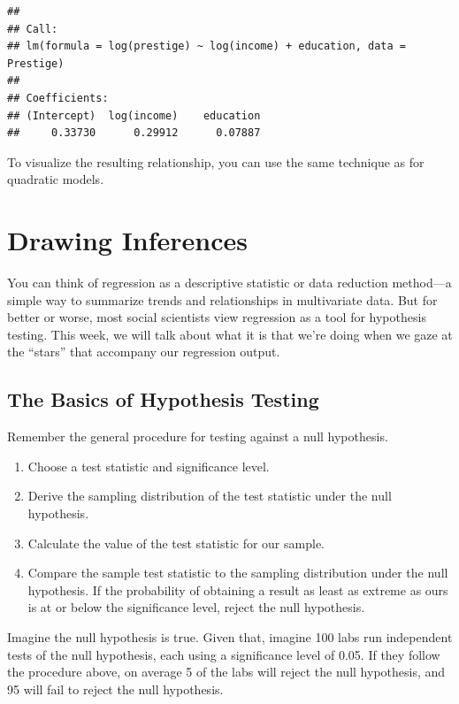 \documentclass[12pt,oneside,openany]{book}
\begin{document}
\begin{verbatim}
## 
## Call:
## lm(formula = log(prestige) ~ log(income) + education, data = Prestige)
## 
## Coefficients:
## (Intercept)  log(income)    education  
##     0.33730      0.29912      0.07887
\end{verbatim}

To visualize the resulting relationship, you can use the same technique
as for quadratic models.

\chapter{Drawing Inferences}\label{inference}

\providecommand{\Cov}{}
\renewcommand{\Cov}{\mathop{\rm Cov}\nolimits}
\providecommand{\SE}{}
\renewcommand{\SE}{\mathop{\rm SE}\nolimits}
\providecommand{\CI}{}
\renewcommand{\CI}{\mathop{\rm CI}\nolimits}

You can think of regression as a descriptive statistic or data reduction
method---a simple way to summarize trends and relationships in
multivariate data. But for better or worse, most social scientists view
regression as a tool for hypothesis testing. This week, we will talk
about what it is that we're doing when we gaze at the ``stars'' that
accompany our regression output.

\section{The Basics of Hypothesis
Testing}\label{the-basics-of-hypothesis-testing}

Remember the general procedure for testing against a null hypothesis.

\begin{enumerate}
\def\labelenumi{\arabic{enumi}.}
\item
  Choose a test statistic and significance level.
\item
  Derive the sampling distribution of the test statistic under the null
  hypothesis.
\item
  Calculate the value of the test statistic for our sample.
\item
  Compare the sample test statistic to the sampling distribution under
  the null hypothesis. If the probability of obtaining a result as least
  as extreme as ours is at or below the significance level, reject the
  null hypothesis.
\end{enumerate}

Imagine the null hypothesis is true. Given that, imagine 100 labs run
independent tests of the null hypothesis, each using a significance
level of 0.05. If they follow the procedure above, on average 5 of the
labs will reject the null hypothesis, and 95 will fail to reject the
null hypothesis.
\end{document}
